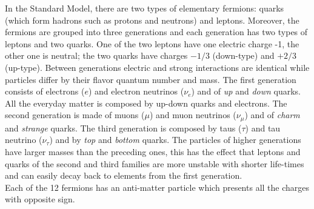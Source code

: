 In the Standard Model, there are two types of elementary fermions: quarks (which form hadrons such as protons and neutrons) and leptons. 
Moreover, the fermions are grouped into three generations and each generation has two types of leptons and two quarks. One of the two leptons have one electric charge -1, the other one is neutral; the two quarks have charges $-1/3$ (down-type) and $+2/3$ (up-type). Between generations electric and strong interactions are identical while particles differ by their flavor quantum number and mass.  The first generation consists of electrons ($e$) and electron neutrinos ($\nu_e$) and of \emph{up} and \emph{down} quarks. All the everyday matter is composed by up-down quarks and electrons. The second generation is made of muons ($\mu$) and muon neutrinos ($\nu_\mu$) and of \emph{charm} and \emph{strange} quarks. The third generation is composed by taus ($\tau$) and tau neutrino ($\nu_\tau$) and by \emph{top} and \emph{bottom} quarks. The particles of higher generations have larger masses than the preceding ones, this has the effect that leptons and quarks of the second and third families are more unstable with shorter life-times and can easily decay back to elements from the first generation.\\
Each of the 12 fermions has an anti-matter particle which presents all the charges with opposite sign.

